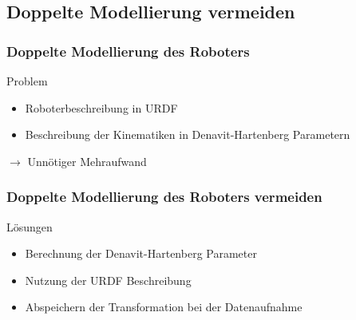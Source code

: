\subsection{Doppelte Modellierung vermeiden}
\begin{frame}
  \frametitle{Doppelte Modellierung des Roboters}

  \begin{block}{Problem}
    \pause
    \begin{itemize}
      \item Roboterbeschreibung in URDF \pause
      \item Beschreibung der Kinematiken in Denavit-Hartenberg Parametern \pause
    \end{itemize}\end{block}
$\rightarrow$ Unnötiger Mehraufwand
\end{frame}

\begin{frame}
  \frametitle{Doppelte Modellierung des Roboters vermeiden}
  \begin{block}{Lösungen}
    \pause
    \begin{itemize}[<+->]
      \item Berechnung der Denavit-Hartenberg Parameter
      \item Nutzung der URDF Beschreibung
      \item {}Abspeichern der Transformation bei der Datenaufnahme
    \end{itemize}\end{block}
\end{frame}


